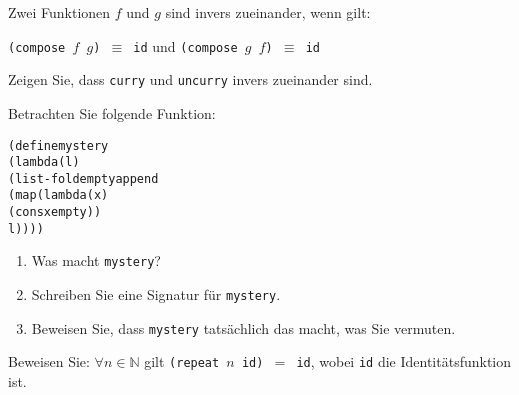 \begin{aufgabe}
  Zwei Funktionen $f$ und $g$ sind invers
  zueinander, wenn gilt:

  \begin{center}
    \texttt{(compose $f$ $g$) $\equiv$ id} und \texttt{(compose $g$ $f$) $\equiv$ id}
  \end{center}

  Zeigen Sie, dass \texttt{curry} und \texttt{uncurry} invers zueinander sind.
\end{aufgabe}

\begin{aufgabe}
  Betrachten Sie folgende Funktion:

  \begin{alltt}
(define mystery
  (lambda (l)
    (list-fold empty append
               (map (lambda (x)
                      (cons x empty))
                    l))))
  \end{alltt}

  \begin{enumerate}
  \item Was macht \texttt{mystery}?

  \item Schreiben Sie eine Signatur für \texttt{mystery}.

  \item Beweisen Sie, dass \texttt{mystery} tatsächlich das macht, was
    Sie vermuten.
  \end{enumerate}
\end{aufgabe}

\begin{aufgabe}
  Beweisen Sie: $\forall n \in \mathbb{N}$ gilt
  \texttt{(repeat $n$ id) $=$ id}, wobei \texttt{id} die
  Identitätsfunktion ist.
\end{aufgabe}

